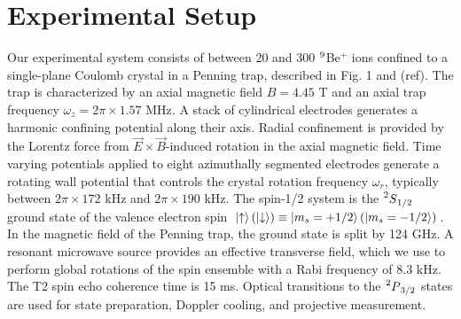 \documentclass[aps,prl,twocolumn,groupedaddress]{revtex4-1}
\begin{document}
\section{Experimental Setup}
Our experimental system consists of between 20 and 300 $\prescript{9}{}{}$Be$^{+}$ ions confined to a single-plane Coulomb crystal in a Penning trap, described in Fig. 1 and (ref). The trap is characterized by an axial magnetic field $B = 4.45$ T and an axial trap frequency $\omega_z = 2\pi \times 1.57$ MHz. A stack of cylindrical electrodes generates a harmonic confining potential along their axis. Radial confinement is provided by the Lorentz force from $\vec{E} \times \vec{B}$-induced rotation in the axial magnetic field. Time varying potentials applied to eight azimuthally segmented electrodes generate a rotating wall potential that controls the crystal rotation frequency $\omega_r$, typically between $2\pi \times 172$ kHz and $2\pi \times 190$ kHz. The spin-1/2 system is the $\prescript{2}{}{S}_{1/2}$ ground state of the valence electron spin $\ket{\uparrow} (\ket{\downarrow}) \equiv \ket{m_{s}=+1/2} (\ket{m_{s}=-1/2}) $. In the magnetic field of the Penning trap, the ground state is split by 124 GHz. A resonant microwave source provides an effective transverse field, which we use to perform global rotations of the spin ensemble with a Rabi frequency of 8.3 kHz. The T2 spin echo coherence time is 15 ms. Optical transitions to the $\prescript{2}{}{P}_{3/2}$ states are used for state preparation, Doppler cooling, and projective measurement. 
\begin{figure}
  \hfill
  \caption{}\label{fig:1}
\end{figure}
\end{document}
